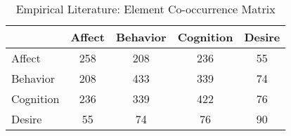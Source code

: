 \begin{table}
\begin{minipage}[t][\textheight][t]{\textwidth}

\caption{\label{tab:EmpiricalElementCooccurrences}Empirical Literature: Element Co-occurrence Matrix}
\begin{tabular}[t]{lcccc}
\toprule
  & Affect & Behavior & Cognition & Desire\\
\midrule
Affect & 258 & 208 & 236 & 55\\
Behavior & 208 & 433 & 339 & 74\\
Cognition & 236 & 339 & 422 & 76\\
Desire & 55 & 74 & 76 & 90\\
\bottomrule
\end{tabular}
\end{minipage}
\end{table}
